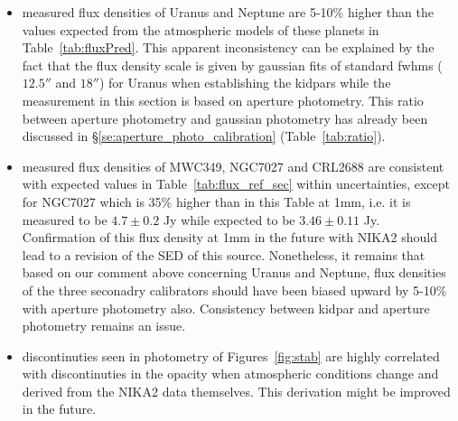 \begin{itemize}
  
\item measured flux densities of Uranus and Neptune are 5-10\% higher than the  values expected from the atmospheric models of these 
planets in Table~\ref{tab:fluxPred}. This apparent inconsistency can be explained by the fact that the flux density scale is given 
by gaussian fits of standard fwhms ($12.5''$ and $18''$) for Uranus when establishing the kidpars while the measurement in this section is based on aperture photometry. 
This ratio between aperture photometry and gaussian photometry has already been discussed in \S\ref{se:aperture_photo_calibration} (Table~\ref{tab:ratio}).


\item   measured flux densities of MWC349, NGC7027 and CRL2688 are consistent with expected values in Table~\ref{tab:flux_ref_sec} within uncertainties, 
except for NGC7027 which is 35\% higher than in this Table at 1mm, i.e. it is measured to be $4.7 \pm 0.2$ Jy while expected to be 
$3.46 \pm 0.11$ Jy. Confirmation of this flux density at 1mm 
 in the future  with NIKA2 should  lead to a revision of the SED of this source. Nonetheless, it remains that based on our comment above concerning
Uranus and Neptune,  flux densities of the three seconadry calibrators should have been biased upward by 5-10\% with aperture photometry also.
Consistency between  kidpar and aperture photometry remains an issue.    


\item discontinuties seen in photometry of Figures~\ref{fig:stab} are highly correlated with discontinuties in the opacity
when atmospheric conditions change and derived from the NIKA2 data themselves. This derivation might be improved in the future. 



\end{itemize}

























